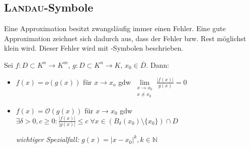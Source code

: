 \subsection{\textsc{Landau}-Symbole}

\begin{*anmerkung}
	Eine Approximation besitzt zwangsläufig immer einen Fehler. Eine gute Approximation zeichnet sich dadurch aus, dass der Fehler bzw. Rest möglichst klein wird. Dieser Fehler wird mit -Symbolen beschrieben.
\end{*anmerkung}

Sei $f:D\subset K^n \to K^m$, $g:D\subset K^n \to K$, $x_0 \in \overline{D}$. Dann:
\begin{itemize}
	\item $f(x) = o(g(x))$ für $x\to x_o$ \gls{gdw} $\lim\limits_{\substack{x\to x_0 \\ x\neq x_0}} \frac{\vert f(x) \vert}{g(x)} = 0$
	\item $f(x) = \mathcal{O}(g(x))$ für $x\to x_0$ \gls{gdw} $\exists \delta > 0, c \ge 0: \frac{\vert f(x) \vert}{\vert g(x) \vert} \le c \;\forall x\in \left( B_\delta(x_0)\setminus \{ x_0\}\right) \cap D$
	
	\emph{wichtiger Spezialfall:} $g(x) = \vert x - x_0\vert ^k, k\in\mathbb{N}$
\end{itemize}

